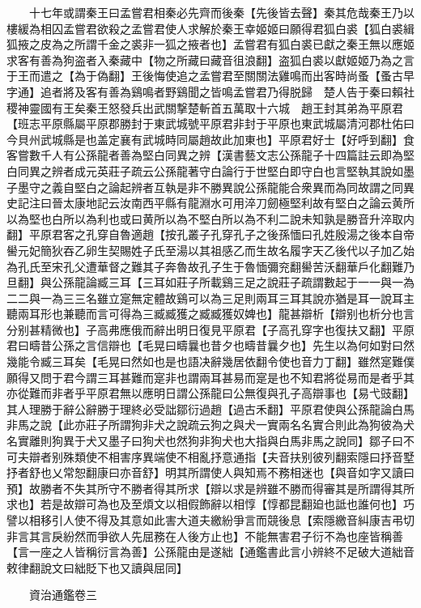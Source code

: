 　　十七年或謂秦王曰孟嘗君相秦必先齊而後秦【先後皆去聲】秦其危哉秦王乃以樓緩為相囚孟嘗君欲殺之孟嘗君使人求解於秦王幸姬姬曰願得君狐白裘【狐白裘緝狐掖之皮為之所謂千金之裘非一狐之掖者也】孟嘗君有狐白裘已獻之秦王無以應姬求客有善為狗盗者入秦藏中【物之所藏曰藏音徂浪翻】盗狐白裘以獻姬姬乃為之言于王而遣之【為于偽翻】王後悔使追之孟嘗君至關關法雞鳴而出客時尚蚤【蚤古早字通】追者將及客有善為鷄鳴者野鷄聞之皆鳴孟嘗君乃得脱歸　楚人告于秦曰賴社稷神靈國有王矣秦王怒發兵出武關撃楚斬首五萬取十六城　趙王封其弟為平原君【班志平原縣屬平原郡勝封于東武城號平原君非封于平原也東武城屬清河郡杜佑曰今貝州武城縣是也盖定襄有武城時同屬趙故此加東也】平原君好士【好呼到翻】食客嘗數千人有公孫龍者善為堅白同異之辨【漢書藝文志公孫龍子十四篇註云即為堅白同異之辨者成元英莊子疏云公孫龍著守白論行于世堅白即守白也言堅執其說如墨子墨守之義自堅白之論起辨者互執是非不勝異說公孫龍能合衆異而為同故謂之同異史記注曰晉太康地記云汝南西平縣有龍淵水可用淬刀劒極堅利故有堅白之論云黄所以為堅也白所以為利也或曰黄所以為不堅白所以為不利二說未知孰是勝音升淬取内翻】平原君客之孔穿自魯適趙【按孔叢子孔穿孔子之後孫愐曰孔姓殷湯之後本自帝嚳元妃簡狄吞乙卵生契賜姓子氏至湯以其祖感乙而生故名履字天乙後代以子加乙始為孔氏至宋孔父遭華督之難其子奔魯故孔子生于魯愐彌兖翻嚳苦沃翻華戶化翻難乃旦翻】與公孫龍論臧三耳【三耳如莊子所載鷄三足之說莊子疏謂數起于一一與一為二二與一為三三名雖立寔無定體故鷄可以為三足則兩耳三耳其說亦猶是耳一說耳主聽兩耳形也兼聽而言可得為三臧臧獲之臧臧獲奴婢也】龍甚辯析【辯别也析分也言分别甚精微也】子高弗應俄而辭出明日復見平原君【子高孔穿字也復扶又翻】平原君曰疇昔公孫之言信辯也【毛晃曰疇曩也昔夕也疇昔曩夕也】先生以為何如對曰然幾能令臧三耳矣【毛晃曰然如也是也語决辭幾居依翻令使也音力丁翻】雖然寔難僕願得又問于君今謂三耳甚難而寔非也謂兩耳甚易而寔是也不知君將從易而是者乎其亦從難而非者乎平原君無以應明日謂公孫龍曰公無復與孔子高辯事也【易弋豉翻】其人理勝于辭公辭勝于理終必受詘鄒衍過趙【過古禾翻】平原君使與公孫龍論白馬非馬之說【此亦莊子所謂狗非犬之說疏云狗之與犬一實兩名名實合則此為狗彼為犬名實離則狗異于犬又墨子曰狗犬也然狗非狗犬也大指與白馬非馬之說同】鄒子曰不可夫辯者别殊類使不相害序異端使不相亂抒意通指【夫音扶别彼列翻索隱曰抒音墅抒者舒也乂常恕翻康曰亦音舒】明其所謂使人與知焉不務相迷也【與音如字又讀曰預】故勝者不失其所守不勝者得其所求【辯以求是辨雖不勝而得審其是所謂得其所求也】若是故辯可為也及至煩文以相假飾辭以相惇【惇都昆翻廹也詆也誰何也】巧譬以相移引人使不得及其意如此害大道夫繳紛爭言而競後息【索隱繳音糾康吉弔切非言其言戾紛然而爭欲人先屈務在人後方止也】不能無害君子衍不為也座皆稱善【言一座之人皆稱衍言為善】公孫龍由是遂絀【通鑑書此言小辨終不足破大道絀音敕律翻說文曰絀貶下也又讀與屈同】

　　資治通鑑卷三  
    


